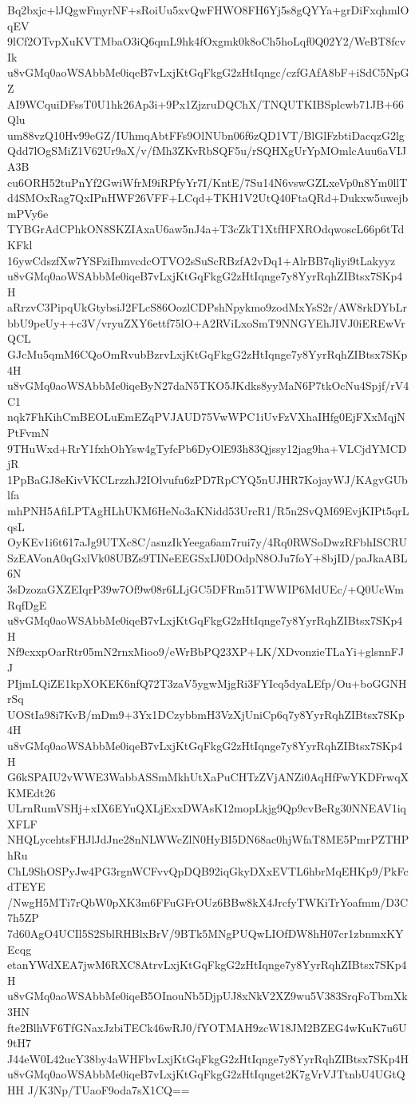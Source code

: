 Bq2bxjc+lJQgwFmyrNF+sRoiUu5xvQwFHWO8FH6Yj5s8gQYYa+grDiFxqhmlOqEV
9lCf2OTvpXuKVTMbaO3iQ6qmL9hk4fOxgmk0k8oCh5hoLqf0Q02Y2/WeBT8fcvIk
u8vGMq0aoWSAbbMe0iqeB7vLxjKtGqFkgG2zHtIqngc/czfGAfA8bF+iSdC5NpGZ
AI9WCquiDFssT0U1hk26Ap3i+9Px1ZjzruDQChX/TNQUTKIBSplcwb71JB+66Qlu
um88vzQ10Hv99eGZ/IUhmqAbtFFs9OlNUbn06f6zQD1VT/BlGlFzbtiDacqzG2lg
Qdd7lOgSMiZ1V62Ur9aX/v/fMh3ZKvRbSQF5u/rSQHXgUrYpMOmlcAuu6aVIJA3B
cu6ORH52tuPnYf2GwiWfrM9iRPfyYr7I/KntE/7Su14N6vswGZLxeVp0n8Ym0llT
d4SMOxRag7QxIPnHWF26VFF+LCqd+TKH1V2UtQ40FtaQRd+Dukxw5uwejbmPVy6e
TYBGrAdCPhkON8SKZIAxaU6aw5nJ4a+T3cZkT1XtfHFXROdqwoscL66p6tTdKFkl
16ywCdszfXw7YSFziIhmvcdcOTVO2sSuScRBzfA2vDq1+AlrBB7qliyi9tLakyyz
u8vGMq0aoWSAbbMe0iqeB7vLxjKtGqFkgG2zHtIqnge7y8YyrRqhZIBtsx7SKp4H
aRrzvC3PipqUkGtybsiJ2FLcS86OozlCDPshNpykmo9zodMxYsS2r/AW8rkDYbLr
bbU9peUy++c3V/vryuZXY6ettf75lO+A2RViLxoSmT9NNGYEhJIVJ0iEREwVrQCL
GJcMu5qmM6CQoOmRvubBzrvLxjKtGqFkgG2zHtIqnge7y8YyrRqhZIBtsx7SKp4H
u8vGMq0aoWSAbbMe0iqeByN27daN5TKO5JKdks8yyMaN6P7tkOcNu4Spjf/rV4C1
nqk7FhKihCmBEOLuEmEZqPVJAUD75VwWPC1iUvFzVXhaIHfg0EjFXxMqjNPtFvmN
9THuWxd+RrY1fxhOhYsw4gTyfcPb6DyOlE93h83Qjssy12jag9ha+VLCjdYMCDjR
1PpBaGJ8eKivVKCLrzzhJ2IOlvufu6zPD7RpCYQ5nUJHR7KojayWJ/KAgvGUblfa
mhPNH5AfiLPTAgHLhUKM6HeNo3aKNidd53UrcR1/R5n2SvQM69EvjKIPt5qrLqsL
OyKEv1i6t617aJg9UTXc8C/asnzIkYeega6am7rui7y/4Rq0RWSoDwzRFbhISCRU
SzEAVonA0qGxlVk08UBZs9TINeEEGSxIJ0DOdpN8OJu7foY+8bjID/paJkaABL6N
3sDzozaGXZEIqrP39w7Of9w08r6LLjGC5DFRm51TWWIP6MdUEc/+Q0UcWmRqfDgE
u8vGMq0aoWSAbbMe0iqeB7vLxjKtGqFkgG2zHtIqnge7y8YyrRqhZIBtsx7SKp4H
Nf9cxxpOarRtr05mN2rnxMioo9/eWrBbPQ23XP+LK/XDvonzieTLaYi+glsnnFJJ
PIjmLQiZE1kpXOKEK6nfQ72T3zaV5ygwMjgRi3FYIcq5dyaLEfp/Ou+boGGNHrSq
UOStIa98i7KvB/mDm9+3Yx1DCzybbmH3VzXjUniCp6q7y8YyrRqhZIBtsx7SKp4H
u8vGMq0aoWSAbbMe0iqeB7vLxjKtGqFkgG2zHtIqnge7y8YyrRqhZIBtsx7SKp4H
G6kSPAIU2vWWE3WabbASSmMkhUtXaPuCHTzZVjANZi0AqHfFwYKDFrwqXKMEdt26
ULrnRumVSHj+xIX6EYuQXLjExxDWAsK12mopLkjg9Qp9cvBeRg30NNEAV1iqXFLF
NHQLycehtsFHJlJdJne28nNLWWcZlN0HyBI5DN68ac0hjWfaT8ME5PmrPZTHPhRu
ChL9ShOSPyJw4PG3rgnWCFvvQpDQB92iqGkyDXxEVTL6hbrMqEHKp9/PkFcdTEYE
/NwgH5MTi7rQbW0pXK3m6FFuGFrOUz6BBw8kX4JrcfyTWKiTrYoafmm/D3C7h5ZP
7d60AgO4UCIl5S2SblRHBlxBrV/9BTk5MNgPUQwLIOfDW8hH07cr1zbnmxKYEcqg
etanYWdXEA7jwM6RXC8AtrvLxjKtGqFkgG2zHtIqnge7y8YyrRqhZIBtsx7SKp4H
u8vGMq0aoWSAbbMe0iqeB5OInouNb5DjpUJ8xNkV2XZ9wu5V383SrqFoTbmXk3HN
fte2BlhVF6TfGNaxJzbiTECk46wRJ0/fYOTMAH9zcW18JM2BZEG4wKuK7u6U9tH7
J44eW0L42ucY38by4aWHFbvLxjKtGqFkgG2zHtIqnge7y8YyrRqhZIBtsx7SKp4H
u8vGMq0aoWSAbbMe0iqeB7vLxjKtGqFkgG2zHtIqnget2K7gVrVJTtnbU4UGtQHH
J/K3Np/TUaoF9oda7sX1CQ==
